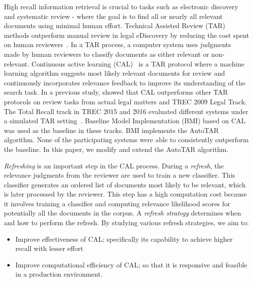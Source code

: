 High recall information retrieval is crucial to tasks such as electronic
discovery and systematic review - where the goal is to find all or nearly all
relevant documents using minimal human effort. Technical Assisted Review (TAR)
methods outperform manual review in legal eDiscovery by reducing the cost spent
on human reviewers~\cite{grossman2010technology,roitblat2010document}.  In a TAR
process, a computer system uses judgments made by human reviewers to classify
documents as either relevant or non-relevant. Continuous active learning
(CAL)~\cite{cormack2014evaluation} is a TAR protocol where a machine learning
algorithm suggests most likely relevant documents for review and continuously
incorporates relevance feedback to improve its understanding of the search task.
In a previous study, \citet{cormack2014evaluation} showed that CAL outperforms other TAR protocols on
review tasks from actual legal matters and TREC 2009 Legal
Track.  The Total Recall track in TREC 2015 and
2016 evaluated different systems under a simulated TAR
setting~\cite{grossman2016trec,roegiest2015trec}.  Baseline Model Implementation
(BMI) based on CAL was used as the baseline in these tracks. BMI implements the
AutoTAR algorithm.  None of the participating systems were able to consistently
outperform the baseline. In this paper, we modify and extend the AutoTAR
algorithm.


\textit{Refreshing} is an important step in the CAL process. During a
\textit{refresh}, the relevance judgments from the reviewer are used to train a
new classifier. This classifier generates an ordered list of documents most
likely to be relevant, which is later processed by the reviewer. This step has a
high computation cost because it involves training a classifier and computing
relevance likelihood scores for potentially all the documents in the corpus. A
\textit{refresh strategy} determines when and how to perform the refresh. By
studying various refresh strategies, we aim to:

\begin{itemize} \item Improve effectiveness of CAL; specifically its capability
to achieve higher recall with lesser effort \item Improve computational
efficiency of CAL; so that it is responsive and  feasible in a production
environment.  \end{itemize}

